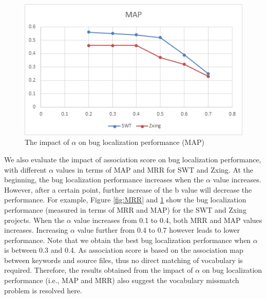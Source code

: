 \documentclass[conference]{IEEEtran}
\begin{document}
\begin{figure}
	\centering
	\includegraphics[scale=0.80]{MAP-SWT-Zxing}
	\caption{The impact of $\alpha$ on bug localization performance (MAP)}
	\label{fig:MAP}
\end{figure}

We also evaluate the impact of association score
on bug localization performance, with different $\alpha$ values in terms of MAP and MRR for SWT and Zxing. At the beginning, the bug localization performance increases when the $\alpha$ value increases. However, after a certain point, further increase of the b value will decrease the performance. For example, Figure \ref{fig:MRR} and \ref{fig:MAP} show the bug localization performance (measured in terms of MRR and MAP) for the SWT and Zxing projects. When the $\alpha$ value increases from 0.1 to 0.4, both MRR and MAP values increases. Increasing $\alpha$ value further from 0.4 to 0.7 however leads to lower performance. Note that we obtain the best bug localization performance when $\alpha$ is between 0.3 and 0.4. As association score is based on the association map between keywords and source files, thus no direct matching of vocabulary is required. Therefore, the results obtained from the impact of $\alpha$ on bug localization performance (i.e., MAP and MRR) also suggest the vocabulary missmatch problem is resolved here.





\end{document}
